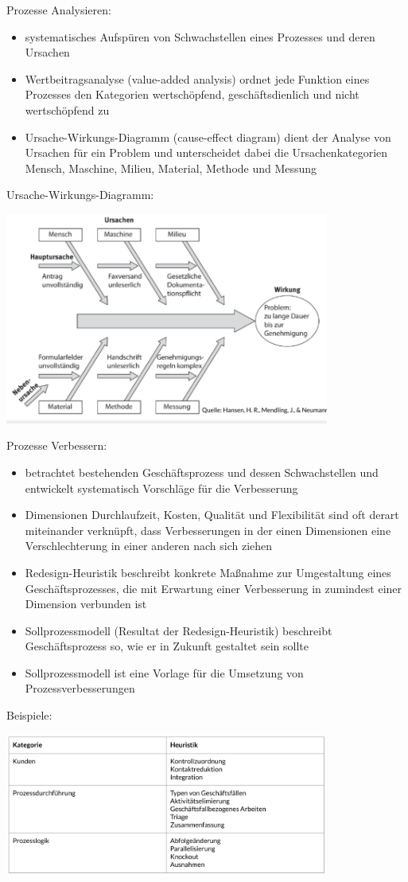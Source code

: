 \clearpage
Prozesse Analysieren:
\begin{itemize}
  \item systematisches Aufspüren von Schwachstellen eines Prozesses und deren Ursachen
  \item Wertbeitragsanalyse (value-added analysis) ordnet jede Funktion eines Prozesses den Kategorien wertschöpfend, geschäftsdienlich und nicht wertschöpfend zu
  \item Ursache-Wirkungs-Diagramm (cause-effect diagram) dient der Analyse von Ursachen für ein Problem und unterscheidet dabei die Ursachenkategorien Mensch, Maschine, Milieu, Material, Methode und Messung
\end{itemize}
Ursache-Wirkungs-Diagramm:
\par
\includegraphics[width=0.8\textwidth]{assets/UrsacheWirkungDIa.PNG}
\par
Prozesse Verbessern:
\begin{itemize}
  \item betrachtet bestehenden Geschäftsprozess und dessen Schwachstellen und entwickelt systematisch Vorschläge für die Verbesserung
  \item Dimensionen Durchlaufzeit, Kosten, Qualität und Flexibilität sind oft derart miteinander verknüpft, dass Verbesserungen in der einen Dimensionen eine Verschlechterung in einer anderen nach sich ziehen
  \item Redesign-Heuristik beschreibt konkrete Maßnahme zur Umgestaltung eines Geschäftsprozesses, die mit Erwartung einer Verbesserung in zumindest einer Dimension verbunden ist
  \item Sollprozessmodell (Resultat der Redesign-Heuristik) beschreibt Geschäftsprozess so, wie er in Zukunft gestaltet sein sollte
  \item Sollprozessmodell ist eine Vorlage für die Umsetzung von Prozessverbesserungen 
\end{itemize}
Beispiele: 
\par
\includegraphics[width=0.8\textwidth]{assets/BeispieleHeuristiken.PNG}

